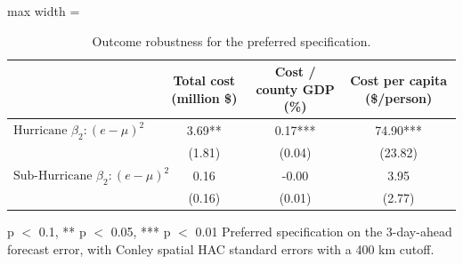 \begin{table}
\centering
\caption{Outcome robustness for the preferred specification. \label{tab:cost_outcomes}}
\centering
\begin{adjustbox}{max width = \textwidth}
\begin{threeparttable}
\begin{tabular}[t]{lccc}
\toprule
  & Total cost (million \$) & Cost / county GDP (\%) & Cost per capita (\$/person)\\
\midrule
$\text{Hurricane } \beta_2: (e - \mu)^2$ & 3.69** & 0.17*** & 74.90***\\
 & (1.81) & (0.04) & (23.82)\\
$\text{Sub-Hurricane } \beta_2: (e - \mu)^2$ & 0.16 & -0.00 & 3.95\\
 & (0.16) & (0.01) & (2.77)\\
\bottomrule
\end{tabular}
\begin{tablenotes}
\item * p $<$ 0.1, ** p $<$ 0.05, *** p $<$ 0.01 Preferred specification on the 3-day-ahead forecast error, with Conley spatial HAC standard errors with a 400 km cutoff.
\end{tablenotes}
\end{threeparttable}
\end{adjustbox}
\end{table}
